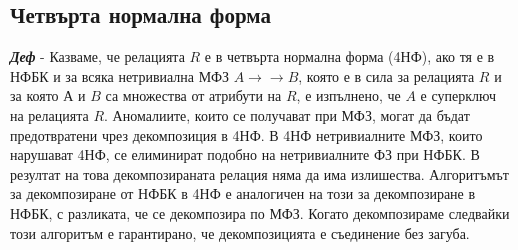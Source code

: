 \documentclass[fleqn,12pt]{article}
\begin{document}
\subsection{Четвърта нормална форма}

\textbf{\textit{Деф}} - Казваме, че релацията $R$ е в четвърта нормална форма (4НФ), ако тя е в НФБК и за всяка нетривиална МФЗ $A \rightarrow \rightarrow B$, която е в сила за релацията $R$ и за която $А$ и $B$ са множества от атрибути на $R$, е изпълнено, че $A$ е суперключ на релацията $R$.
\bigbreak
Аномалиите, които се получават при МФЗ, могат да бъдат предотвратени чрез декомпозиция в 4НФ.
В 4НФ нетривиалните МФЗ, които нарушават 4НФ, се елиминират подобно на нетривиалните ФЗ при НФБК.
В резултат на това декомпозираната релация няма да има излишества.
\bigbreak
Алгоритъмът за декомпозиране от НФБК в 4НФ е аналогичен на този за декомпозиране в НФБК, с разликата, че се декомпозира по МФЗ.
Когато декомпозираме следвайки този алгоритъм е гарантирано, че декомпозицията е съединение без загуба.
\end{document}
